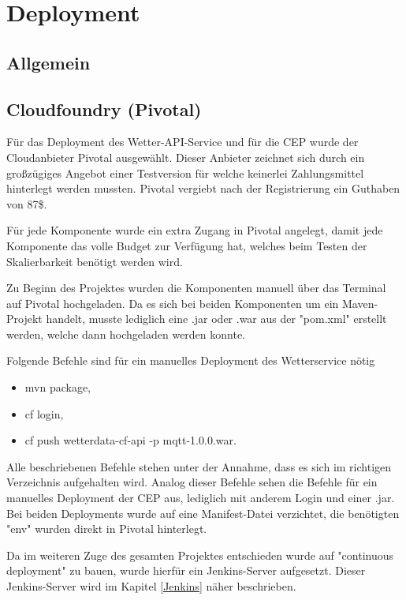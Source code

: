 \section{Deployment}
\subsection{Allgemein}
\subsection{Cloudfoundry (Pivotal)}
Für das Deployment des Wetter-API-Service und für die CEP wurde der Cloudanbieter Pivotal ausgewählt. Dieser Anbieter zeichnet sich durch ein großzügiges Angebot einer Testversion für welche keinerlei Zahlungsmittel hinterlegt werden mussten. Pivotal vergiebt nach der Registrierung ein Guthaben von 87\$. 

Für jede Komponente wurde ein extra Zugang in Pivotal angelegt, damit jede Komponente das volle Budget zur Verfügung hat, welches beim Testen der Skalierbarkeit benötigt werden wird. 

Zu Beginn des Projektes wurden die Komponenten manuell über das Terminal auf Pivotal hochgeladen. Da es sich bei beiden Komponenten um ein Maven-Projekt handelt, musste lediglich eine .jar oder .war aus der "pom.xml" erstellt werden, welche dann hochgeladen werden konnte. 

Folgende Befehle sind für ein manuelles Deployment des Wetterservice nötig 

\begin{itemize}
\item mvn package,
\item cf login, 
\item cf push wetterdata-cf-api -p mqtt-1.0.0.war.
\end{itemize}
Alle beschriebenen Befehle stehen unter der Annahme, dass es sich im richtigen Verzeichnis aufgehalten wird. Analog dieser Befehle  sehen die Befehle für ein manuelles Deployment der CEP aus, lediglich mit anderem Login und einer .jar. Bei beiden Deployments wurde auf eine Manifest-Datei verzichtet, die benötigten "env" wurden direkt in Pivotal hinterlegt. 

Da im weiteren Zuge des gesamten Projektes entschieden wurde auf "continuous deployment" zu bauen, wurde hierfür ein Jenkins-Server aufgesetzt. Dieser Jenkins-Server wird im Kapitel \ref{Jenkins} näher beschrieben. 

